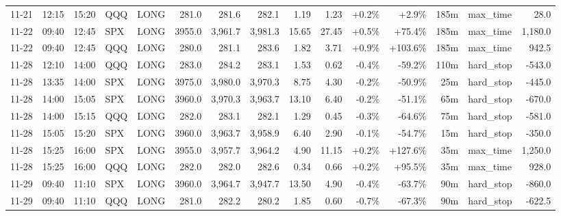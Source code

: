 \documentclass[11pt,a4paper,twoside]{article}
\begin{document}
\begin{landscape}
\begin{center}
\begin{longtable}{>{\color{txtmain}}l l l l l r r r r r r r r >{\color{txtmain}}l r}
11-21 & 12:15 & 15:20 & QQQ & LONG & 281.0 & 281.6 & 282.1 & 1.19 & 1.23 & \textcolor{wingreen}{+0.2\%} & \textcolor{wingreen}{+2.9\%} & 185m & max\_time & \textcolor{wingreen}{28.0} \\
11-22 & 09:40 & 12:45 & SPX & LONG & 3955.0 & 3,961.7 & 3,981.3 & 15.65 & 27.45 & \textcolor{wingreen}{+0.5\%} & \textcolor{wingreen}{+75.4\%} & 185m & max\_time & \textcolor{wingreen}{1,180.0} \\
11-22 & 09:40 & 12:45 & QQQ & LONG & 280.0 & 281.1 & 283.6 & 1.82 & 3.71 & \textcolor{wingreen}{+0.9\%} & \textcolor{wingreen}{+103.6\%} & 185m & max\_time & \textcolor{wingreen}{942.5} \\
11-28 & 12:10 & 14:00 & QQQ & LONG & 283.0 & 284.2 & 283.1 & 1.53 & 0.62 & \textcolor{lossred}{-0.4\%} & \textcolor{lossred}{-59.2\%} & 110m & hard\_stop & \textcolor{lossred}{-543.0} \\
11-28 & 13:35 & 14:00 & SPX & LONG & 3975.0 & 3,980.0 & 3,970.3 & 8.75 & 4.30 & \textcolor{lossred}{-0.2\%} & \textcolor{lossred}{-50.9\%} & 25m & hard\_stop & \textcolor{lossred}{-445.0} \\
11-28 & 14:00 & 15:05 & SPX & LONG & 3960.0 & 3,970.3 & 3,963.7 & 13.10 & 6.40 & \textcolor{lossred}{-0.2\%} & \textcolor{lossred}{-51.1\%} & 65m & hard\_stop & \textcolor{lossred}{-670.0} \\
11-28 & 14:00 & 15:15 & QQQ & LONG & 282.0 & 283.1 & 282.1 & 1.29 & 0.45 & \textcolor{lossred}{-0.3\%} & \textcolor{lossred}{-64.6\%} & 75m & hard\_stop & \textcolor{lossred}{-581.0} \\
11-28 & 15:05 & 15:20 & SPX & LONG & 3960.0 & 3,963.7 & 3,958.9 & 6.40 & 2.90 & \textcolor{lossred}{-0.1\%} & \textcolor{lossred}{-54.7\%} & 15m & hard\_stop & \textcolor{lossred}{-350.0} \\
11-28 & 15:25 & 16:00 & SPX & LONG & 3955.0 & 3,957.7 & 3,964.2 & 4.90 & 11.15 & \textcolor{wingreen}{+0.2\%} & \textcolor{wingreen}{+127.6\%} & 35m & max\_time & \textcolor{wingreen}{1,250.0} \\
11-28 & 15:25 & 16:00 & QQQ & LONG & 282.0 & 282.0 & 282.6 & 0.34 & 0.66 & \textcolor{wingreen}{+0.2\%} & \textcolor{wingreen}{+95.5\%} & 35m & max\_time & \textcolor{wingreen}{928.0} \\
11-29 & 09:40 & 11:10 & SPX & LONG & 3960.0 & 3,964.7 & 3,947.7 & 13.50 & 4.90 & \textcolor{lossred}{-0.4\%} & \textcolor{lossred}{-63.7\%} & 90m & hard\_stop & \textcolor{lossred}{-860.0} \\
11-29 & 09:40 & 11:10 & QQQ & LONG & 281.0 & 282.2 & 280.2 & 1.85 & 0.60 & \textcolor{lossred}{-0.7\%} & \textcolor{lossred}{-67.3\%} & 90m & hard\_stop & \textcolor{lossred}{-622.5} \\

\end{longtable}
\end{center}
\end{landscape}
\end{document}
